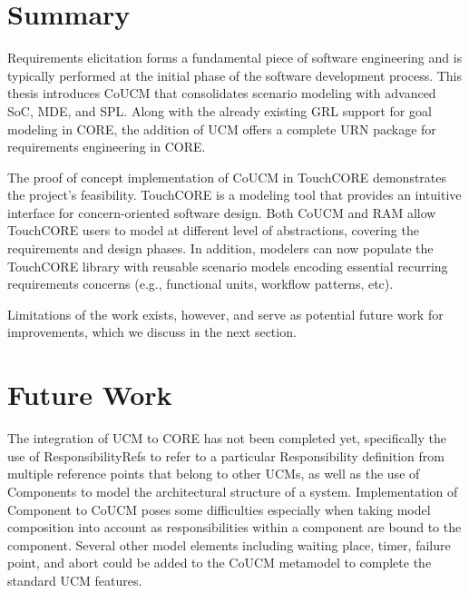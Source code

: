 \section{Summary}

Requirements elicitation forms a fundamental piece of software engineering and is typically performed at the initial phase of the software development process. This thesis introduces CoUCM that consolidates scenario modeling with advanced SoC, MDE, and SPL. Along with the already existing GRL support for goal modeling in CORE, the addition of UCM offers a complete URN package for requirements engineering in CORE.

The proof of concept implementation of CoUCM in TouchCORE demonstrates the project's feasibility. TouchCORE is a modeling tool that provides an intuitive interface for concern-oriented software design. Both CoUCM and RAM allow TouchCORE users to model at different level of abstractions, covering the requirements and design phases. In addition, modelers can now populate the TouchCORE library with reusable scenario models encoding essential recurring requirements concerns (e.g., functional units, workflow patterns, etc).

Limitations of the work exists, however, and serve as potential future work for improvements, which we discuss in the next section.

\section{Future Work}

The integration of UCM to CORE has not been completed yet, specifically the use of {\cls ResponsibilityRef}s to refer to a particular {\cls Responsibility} definition from multiple reference points that belong to other UCMs, as well as the use of {\cls Component}s to model the architectural structure of a system. Implementation of {\cls Component} to CoUCM poses some difficulties especially when taking model composition into account as responsibilities within a component are bound to the component. Several other model elements including waiting place, timer, failure point, and abort could be added to the CoUCM metamodel to complete the standard UCM features.

